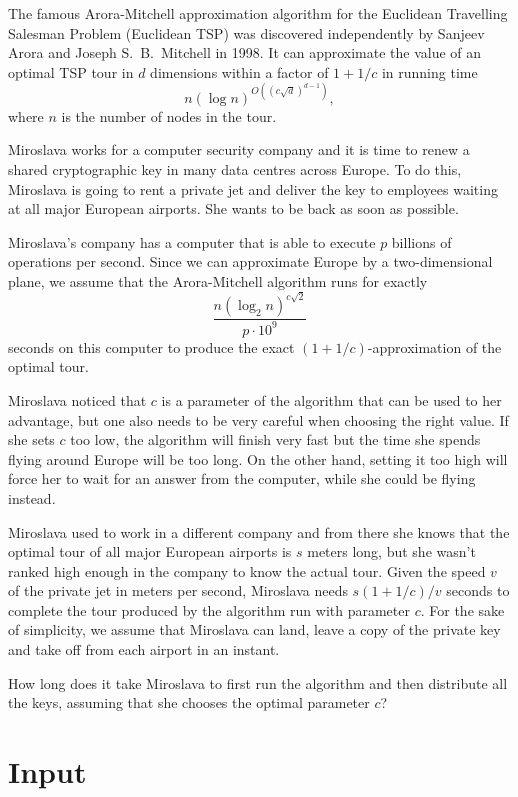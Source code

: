 
%
\noindent
The famous Arora-Mitchell approximation algorithm for the Euclidean Travelling Salesman Problem
(Euclidean TSP) was discovered independently by Sanjeev Arora and Joseph S.\ B.\ Mitchell in
1998. It can approximate the value of an optimal TSP tour in $d$ dimensions within a factor of
$1+1/c$ in running time
$$n (\log n)^{O((c\sqrt{d})^{d-1})},$$
where $n$ is the number of nodes in the tour.

Miroslava works for a computer security company and it is time to renew a shared cryptographic key in
many data centres across Europe. To do this, Miroslava is going to rent a private jet and deliver the
key to employees waiting at all major European airports. She wants to be back as soon as possible.

Miroslava's company has a computer that is able to execute $p$ billions of operations per second.
Since we can approximate Europe by a two-dimensional plane, we assume that the Arora-Mitchell algorithm runs for exactly
$$\frac{n (\log_2 n)^{c\sqrt{2}}}{p \cdot 10^9}$$
seconds on this computer to produce the exact $(1+1/c)$-approximation of the optimal tour.

Miroslava noticed that $c$ is a parameter of the algorithm that can be used to her advantage, but one
also needs to be very careful when choosing the right value. If she sets
$c$ too low, the algorithm will finish very fast but the time she spends flying around Europe will be
too long. On the other hand, setting it too high will force her to wait for an answer from the computer,
while she could be flying instead.

Miroslava used to work in a different company and from there she knows that the optimal tour of all
major European airports is $s$ meters long, but she wasn't ranked high enough in the company to know the
actual tour. Given the speed $v$ of the private jet in meters per second, Miroslava needs
$s(1 + 1 / c) / v$ seconds to complete the tour produced by the algorithm run with parameter $c$. For
the sake of simplicity, we assume that Miroslava can land, leave a copy of the private key and take
off from each airport in an instant.

How long does it take Miroslava to first run the algorithm and then distribute all the keys,
assuming that she chooses the optimal parameter $c$?

\section*{Input}

